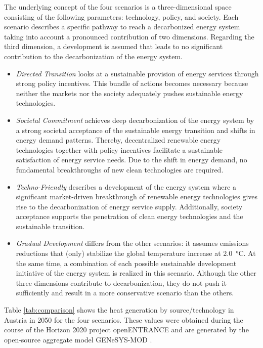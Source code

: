 The underlying concept of the four scenarios is a three-dimensional space consisting of the following parameters: technology, policy, and society. Each scenario describes a specific pathway to reach a decarbonized energy system taking into account a pronounced contribution of two dimensions. Regarding the third dimension, a development is assumed that leads to no significant contribution to the decarbonization of the energy system. 

\begin{itemize}
	\item \textit{Directed Transition} looks at a sustainable provision of energy services through strong policy incentives. This bundle of actions becomes necessary because neither the markets nor the society adequately pushes sustainable energy technologies.
	\item \textit{Societal Commitment} achieves deep decarbonization of the energy system by a strong societal acceptance of the sustainable energy transition and shifts in energy demand patterns. Thereby, decentralized renewable energy technologies together with policy incentives facilitate a sustainable satisfaction of energy service needs. Due to the shift in energy demand, no fundamental breakthroughs of new clean technologies are required.
	\item \textit{Techno-Friendly} describes a development of the energy system where a significant market-driven breakthrough of renewable energy technologies gives rise to the decarbonization of energy service supply. Additionally, society acceptance supports the penetration of clean energy technologies and the sustainable transition.
	\item \textit{Gradual Development} differs from the other scenarios: it assumes emissions reductions that (only) stabilize the global temperature increase at \SI{2.0}{\degreeCelsius}. At the same time, a combination of each possible sustainable development initiative of the energy system is realized in this scenario. Although the other three dimensions contribute to decarbonization, they do not push it sufficiently and result in a more conservative scenario than the others.
\end{itemize}

Table \ref{tab:comparison} shows the heat generation by source/technology in Austria in 2050 for the four scenarios. These values were obtained during the course of the Horizon 2020 project openENTRANCE and are generated by the open-source aggregate model GENeSYS-MOD \cite{burandt2018genesys}. 

